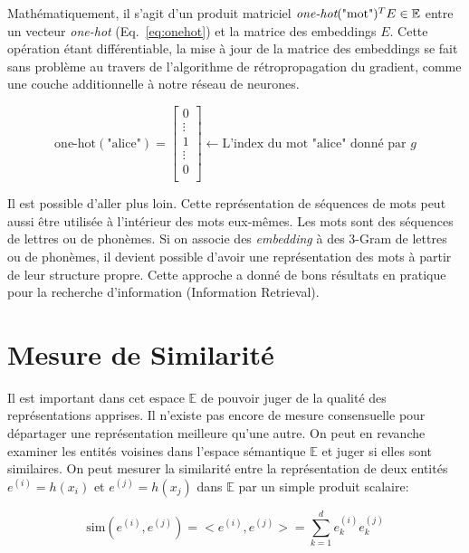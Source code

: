 Mathématiquement, il s'agit d'un produit matriciel
$\textrm{\it one-hot}(\textrm{"mot"})^{T}E\in\mathbb{E}$ entre un vecteur {\it one-hot}
(Eq.~\ref{eq:onehot}) et la matrice des embeddings $E$. Cette opération étant
différentiable, la mise à jour de la matrice des embeddings se fait sans
problème au travers de l'algorithme de rétropropagation du gradient, comme
une couche additionnelle à notre réseau de neurones.

\begin{equation}
\label{eq:onehot}
\textrm{one-hot}(\textrm{"alice"}) =
\begin{bmatrix}
0\\
\vdots\\
1\\
\vdots\\
0\\
\end{bmatrix} 
\leftarrow \textrm{L'index du mot "alice" donné par $g$}
\end{equation}


Il est possible d'aller plus loin. Cette représentation de séquences de mots
peut aussi être utilisée à l'intérieur des mots eux-mêmes. Les mots sont des
séquences de lettres ou de phonèmes. Si on associe des {\it embedding} à des
3-Gram de lettres ou de phonèmes, il devient possible d'avoir une
représentation des mots à partir de leur structure propre.  Cette approche
\citep{rnn58} a donné de bons résultats en pratique pour la recherche
d'information (Information Retrieval).

\section{Mesure de Similarité}

Il est important dans cet espace $\mathbb{E}$ de pouvoir juger de la qualité des
représentations apprises. Il n'existe pas encore de mesure consensuelle pour départager une
représentation meilleure qu'une autre. On peut en revanche examiner les entités
voisines dans l'espace sémantique $\mathbb{E}$ et juger si elles sont
similaires. On peut mesurer la similarité entre la représentation de deux entités $e^{(i)}=h(x_i)$ et
$e^{(j)}=h(x_j)$ dans $\mathbb{E}$ par un simple produit scalaire:

\begin{equation}
\label{eq:dot-simple}
\textrm{sim}(e^{(i)}, e^{(j)})=<e^{(i)}, e^{(j)}> = \sum_{k=1}^{d}e^{(i)}_k e^{(j)}_k
\end{equation}

